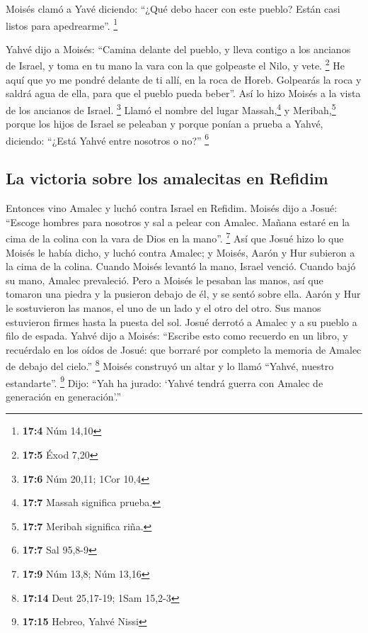 \begin{paracol}{2}
 Moisés clamó a Yavé diciendo: ``¿Qué debo hacer con este
pueblo? Están casi listos para apedrearme''. \footnote{\textbf{17:4} Núm
  14,10}

 Yahvé dijo a Moisés: ``Camina delante del pueblo, y lleva
contigo a los ancianos de Israel, y toma en tu mano la vara con la que
golpeaste el Nilo, y vete. \footnote{\textbf{17:5} Éxod 7,20}
 He aquí que yo me pondré delante de ti allí, en la roca
de Horeb. Golpearás la roca y saldrá agua de ella, para que el pueblo
pueda beber''. Así lo hizo Moisés a la vista de los ancianos de Israel.
\footnote{\textbf{17:6} Núm 20,11; 1Cor 10,4}  Llamó el
nombre del lugar Massah,\footnote{\textbf{17:7} Massah significa prueba.}
y Meribah,\footnote{\textbf{17:7} Meribah significa riña.} porque los
hijos de Israel se peleaban y porque ponían a prueba a Yahvé, diciendo:
``¿Está Yahvé entre nosotros o no?'' \footnote{\textbf{17:7} Sal 95,8-9}

\hypertarget{la-victoria-sobre-los-amalecitas-en-refidim}{%
\subsection{La victoria sobre los amalecitas en
Refidim}\label{la-victoria-sobre-los-amalecitas-en-refidim}}

 Entonces vino Amalec y luchó contra Israel en Refidim.
 Moisés dijo a Josué: ``Escoge hombres para nosotros y sal
a pelear con Amalec. Mañana estaré en la cima de la colina con la vara
de Dios en la mano''. \footnote{\textbf{17:9} Núm 13,8; Núm 13,16}
 Así que Josué hizo lo que Moisés le había dicho, y luchó
contra Amalec; y Moisés, Aarón y Hur subieron a la cima de la colina.
 Cuando Moisés levantó la mano, Israel venció. Cuando
bajó su mano, Amalec prevaleció.  Pero a Moisés le
pesaban las manos, así que tomaron una piedra y la pusieron debajo de
él, y se sentó sobre ella. Aarón y Hur le sostuvieron las manos, el uno
de un lado y el otro del otro. Sus manos estuvieron firmes hasta la
puesta del sol.  Josué derrotó a Amalec y a su pueblo a
filo de espada.  Yahvé dijo a Moisés: ``Escribe esto como
recuerdo en un libro, y recuérdalo en los oídos de Josué: que borraré
por completo la memoria de Amalec de debajo del cielo.'' \footnote{\textbf{17:14}
  Deut 25,17-19; 1Sam 15,2-3}  Moisés construyó un altar
y lo llamó ``Yahvé, nuestro estandarte''. \footnote{\textbf{17:15}
  Hebreo, Yahvé Nissi}  Dijo: ``Yah ha jurado: `Yahvé
tendrá guerra con Amalec de generación en generación'.''


\end{paracol}
